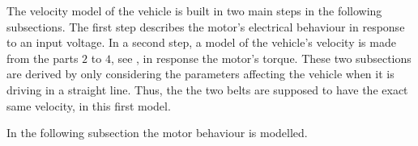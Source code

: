 The velocity model of the vehicle is built in two main steps in the following subsections. The first step describes the motor's electrical behaviour in response to an input voltage. In a second step, a model of the vehicle's velocity is made from the parts $2$ to $4$, see , in response the motor's torque. These two subsections are derived by only considering the parameters affecting the vehicle when it is driving in a straight line. Thus, the the two belts are supposed to have the exact same velocity, in this first model.

In the following subsection the motor behaviour is modelled.